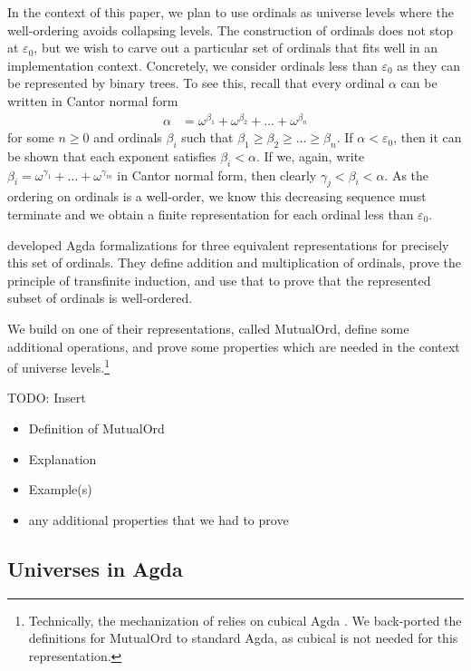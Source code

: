\documentclass[manuscript,screen,review,anonymous]{acmart}
\begin{document}
In the context of this paper, we plan to use
ordinals as universe levels where the well-ordering avoids collapsing
levels. The construction of ordinals does not stop at $\varepsilon_0$,
but we wish to  carve out a particular set of ordinals that fits
well in an implementation context. Concretely, we consider ordinals
less than $\varepsilon_0$ as they can be represented by binary trees.
To see this, recall that every ordinal $\alpha$ can be written in
Cantor normal form
\begin{align*}
  \alpha &= \omega^{\beta_1} + \omega^{\beta_2}  + \dots + \omega^{\beta_n}
\end{align*}
for some $n\ge0$ and ordinals $\beta_i$ such that
$\beta_1\ge\beta_2\ge \dots \ge \beta_n$. If $\alpha < \varepsilon_0$,
then it can be shown that each exponent satisfies $\beta_i < \alpha$.
If we, again, write $\beta_i = \omega^{\gamma_1} + \dots +
\omega^{\gamma_m}$ in Cantor normal form, then clearly $\gamma_j <
\beta_i < \alpha$. As the ordering on ordinals is a well-order, we
know this decreasing sequence must terminate and we obtain a finite
representation for each ordinal less than $\varepsilon_0$.

\citet{DBLP:conf/cpp/ForsbergXG20} developed Agda
formalizations for three equivalent representations for precisely this
set of ordinals. They define addition and multiplication of ordinals,
prove the principle of transfinite induction, and use that to prove
that the represented subset of ordinals is well-ordered.

We build on one of their representations, called MutualOrd, define
some additional operations, and prove some properties which are needed
in the context of universe levels.\footnote{Technically, the
  mechanization of \citet{DBLP:conf/cpp/ForsbergXG20} relies on
  cubical Agda \cite{XXX}. We back-ported the definitions for
  MutualOrd to standard Agda, as cubical is not needed for this representation.}

TODO: Insert
\begin{itemize}
\item Definition of MutualOrd
\item Explanation
\item Example(s)
\item any additional properties that we had to prove
\end{itemize}

\subsection{Universes in Agda}
\label{sec:universes-agda}
\end{document}
